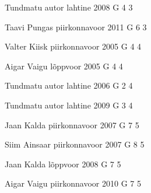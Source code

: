 \documentclass[11pt]{article}
\begin{document}
{Tundmatu autor} %
{lahtine} %
{2008} %
{G 4} %
{3} %
{

\ifEngHint
\fi
}

{Taavi Pungas} %
{piirkonnavoor} %
{2011} %
{G 6} %
{3} %
{

\ifEngHint
\fi
}

{Valter Kiisk} %
{piirkonnavoor} %
{2005} %
{G 4} %
{4} %
{

\ifEngHint
\fi
}

{Aigar Vaigu} %
{lõppvoor} %
{2005} %
{G 4} %
{4} %
{

\ifEngHint
\fi
}

{Tundmatu autor} %
{lahtine} %
{2006} %
{G 2} %
{4} %
{

\ifEngHint
\fi
}

{Tundmatu autor} %
{lahtine} %
{2009} %
{G 3} %
{4} %
{

\ifEngHint
\fi
}

{Jaan Kalda} %
{piirkonnavoor} %
{2007} %
{G 7} %
{5} %
{

\ifEngHint
\fi
}

{Siim Ainsaar} %
{piirkonnavoor} %
{2007} %
{G 8} %
{5} %
{

\ifEngHint
\fi
}

{Jaan Kalda} %
{lõppvoor} %
{2008} %
{G 7} %
{5} %
{

\ifEngHint
\fi
}

{Aigar Vaigu} %
{piirkonnavoor} %
{2010} %
{G 7} %
{5} %
{

\ifEngHint
\fi
}
\end{document}
